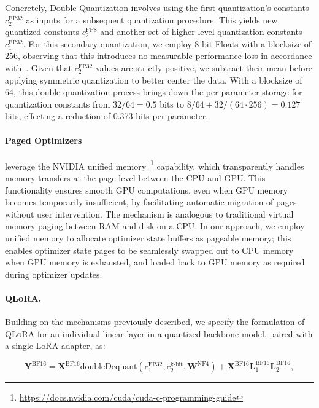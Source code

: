 Concretely, Double Quantization involves using the first quantization's constants $c_2^{\text{FP32}}$ as inputs for a subsequent quantization procedure. This yields new quantized constants $c_2^{\text{FP8}}$ and another set of higher-level quantization constants $c_1^{\text{FP32}}$. For this secondary quantization, we employ 8-bit Floats with a blocksize of 256, observing that this introduces no measurable performance loss in accordance with~\citet{dettmers2022case}. Given that $c_2^{\text{FP32}}$ values are strictly positive, we subtract their mean before applying symmetric quantization to better center the data. With a blocksize of 64, this double quantization process brings down the per-parameter storage for quantization constants from $32/64=0.5$ bits to $8/64 + 32/(64\cdot256) = 0.127$ bits, effecting a reduction of 0.373 bits per parameter.

\paragraph{Paged Optimizers} leverage the NVIDIA unified memory~\footnote{\tiny \url{https://docs.nvidia.com/cuda/cuda-c-programming-guide}} capability, which transparently handles memory transfers at the page level between the CPU and GPU. This functionality ensures smooth GPU computations, even when GPU memory becomes temporarily insufficient, by facilitating automatic migration of pages without user intervention. The mechanism is analogous to traditional virtual memory paging between RAM and disk on a CPU. In our approach, we employ unified memory to allocate optimizer state buffers as pageable memory; this enables optimizer state pages to be seamlessly swapped out to CPU memory when GPU memory is exhausted, and loaded back to GPU memory as required during optimizer updates.

\paragraph{\textsc{QLoRA}.} Building on the mechanisms previously described, we specify the formulation of \textsc{QLoRA} for an individual linear layer in a quantized backbone model, paired with a single LoRA adapter, as:

\begin{equation}
    \mathbf{Y}^{\text{BF16}} =  \mathbf{X}^{\text{BF16}} \text{doubleDequant}(c_1^{\text{FP32}}, c_2^{\text{k-bit}}, \mathbf{W}^{\text{NF4}}) + \mathbf{X}^{\text{BF16}}\mathbf{L}^{\text{BF16}}_1\mathbf{L}^{\text{BF16}}_2,
\end{equation}

